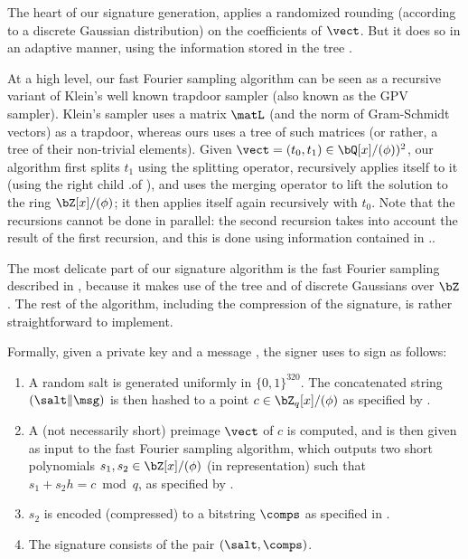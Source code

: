The heart of our signature generation, \longffsampling applies a randomized rounding (according to a discrete Gaussian distribution) on the coefficients of $\vect$. But it does so in an adaptive manner, using the information stored in the \falcon tree \tree.

At a high level, our fast Fourier sampling algorithm can be seen as a recursive variant of Klein's well known trapdoor sampler (also known as the GPV sampler). Klein's sampler uses a matrix $\matL$ (and the norm of Gram-Schmidt vectors) as a trapdoor, whereas ours uses a tree of such matrices (or rather, a tree of their non-trivial elements).
Given $\vect = (t_0, t_1) \in \bQ[x]/(\phi))^2$, our algorithm first splits $t_1$ using the splitting operator, recursively applies itself to it (using the right child \tree.\rchild of \tree), and uses the merging operator to lift the solution to the ring $\bZ[x]/(\phi)$; it then applies itself again recursively with $t_0$. Note that the recursions cannot be done in parallel: the second recursion takes into account the result of the first recursion, and this is done using information contained in \tree.\data.

The most delicate part of our signature algorithm is the fast Fourier sampling described in \ffsampling, because it makes use of the \falcon tree and of discrete Gaussians over $\bZ$. The rest of the algorithm, including the compression of the signature, is rather straightforward to implement.

Formally, given a private key \sk and a message \msg, the signer uses \sk to sign \msg as follows:
\begin{enumerate}
 \item A random salt \salt is generated uniformly in $\{0, 1\}^{320}$. The concatenated string $(\salt\|\msg)$ is then hashed to a point $c \in \bZ_q[x]/(\phi)$ as specified by \longhashtopoint.
 \item A (not necessarily short) preimage $\vect$ of $c$ is computed, and is then given as input to the fast Fourier sampling algorithm, which outputs two short polynomials $s_1, s_2 \in \bZ[x]/(\phi)$ (in \fft representation) such that $s_1 + s_2 h = c \bmod q$, as specified by \longffsampling.
 \item $s_2$ is encoded (compressed) to a bitstring $\comps$ as specified in \longcompress.
 \item
 The signature consists of the pair $(\salt, \comps)$.
\end{enumerate}


